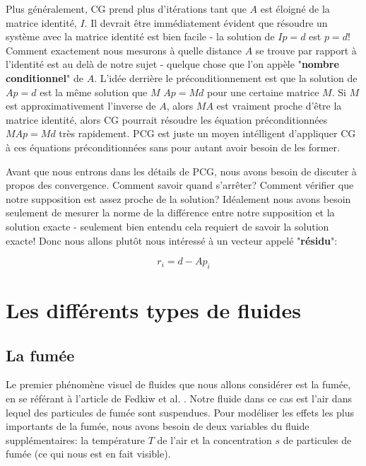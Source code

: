 \documentclass[11pt]{report}
\begin{document}
Plus généralement, CG prend plus d'itérations tant que $A$ est éloigné de la matrice identité, $I$. Il devrait être immédiatement évident que résoudre un système avec la matrice identité est bien facile - la solution de $Ip = d$ est $p = d$! Comment exactement nous mesurons à quelle distance $A$ se trouve par rapport à l'identité est au delà de notre sujet - quelque chose que l'on appèle "\textbf{nombre conditionnel}" de $A$. L'idée derrière le préconditionnement est que la solution de $Ap = d$ est la même solution que $M\,\,Ap=Md$ pour une certaine matrice $M$. Si $M$ est approximativement l'inverse de $A$, alors $MA$ est vraiment proche d'être la matrice identité, alors CG pourrait résoudre les équation préconditionnées $MAp = Md$ très rapidement. PCG est juste un moyen intélligent d'appliquer CG à ces équations préconditionnées sans pour autant avoir besoin de les former. \newline
 
Avant que nous entrons dans les détails de PCG, nous avons besoin de discuter à propos des convergence. Comment savoir quand s'arrêter? Comment vérifier que notre supposition est assez proche de la solution? Idéalement nous avons besoin seulement de mesurer la norme de la différence entre notre supposition et la solution exacte - seulement bien entendu cela requiert de savoir la solution exacte! Donc nous allons plutôt nous intéressé à un vecteur appelé "\textbf{résidu}":

\begin{equation}
r_i = d - Ap_i
\end{equation}


\part{Les différents types de fluides}

\chapter{La fumée}

Le premier phénomène visuel de fluides que nous allons considérer est la fumée, en se référant à l'article de Fedkiw et al. \cite{fedkiw-stam-jensen-01}. Notre fluide dans ce cas est l'air dans lequel des particules de fumée sont suspendues. Pour modéliser les effets les plus importants de la fumée, nous avons besoin de deux variables du fluide supplémentaires: la température $T$ de l'air et la concentration $s$ de particules de fumée (ce qui nous est en fait visible).\newline
\end{document}
